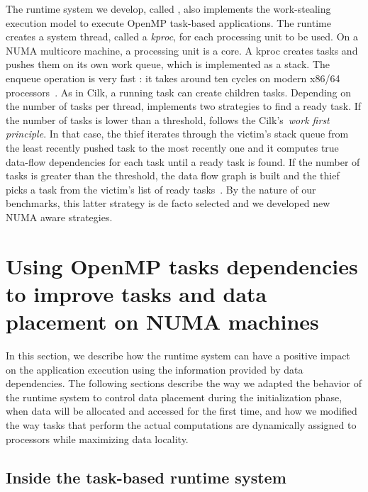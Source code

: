 \documentclass[parallelisme]{compas2016}
\begin{document}
The runtime system we develop, called \kaapi, also implements the work-stealing execution model to execute OpenMP task-based applications.
The runtime creates a system thread, called a \emph{kproc}, for each processing unit to be used.
On a NUMA multicore machine, a processing unit is a core.
A kproc creates tasks and pushes them on its own work queue, which is implemented as a stack.
The enqueue operation is very fast : it takes around ten cycles on modern x86/64 processors~\cite{libkomp}.
As in Cilk, a  running \kaapi task can create children tasks. 
Depending on the number of tasks per thread, \kaapi implements two strategies to find a ready task.
If the number of tasks is lower than a threshold, \kaapi follows the Cilk's~\textit{work first principle}. 
In that case, the thief iterates through the victim's stack queue from 
the least recently pushed task to the most recently one and it computes true
data-flow dependencies for each task until a ready task is found. If the number of tasks is greater than the threshold, 
the data flow graph is built and the thief picks a task from the victim's list of ready tasks~\cite{Bleuse2014}.
By the nature of our benchmarks, this latter strategy is de facto selected and we developed new NUMA aware strategies.



\section{Using OpenMP tasks dependencies to improve tasks and data
  placement on NUMA machines}
\label{sec:contributions}

In this section, we describe how the runtime system can have a positive impact on the application execution using the information provided by data dependencies.
The following sections describe the way we adapted the behavior of the runtime system to control data placement during the initialization phase, when data will be allocated and accessed for the first time, and how we modified the way tasks that perform the actual computations are dynamically assigned to processors while maximizing data locality.

\vspace*{-1ex}
\subsection{Inside the \kaapi task-based runtime system}
\end{document}

